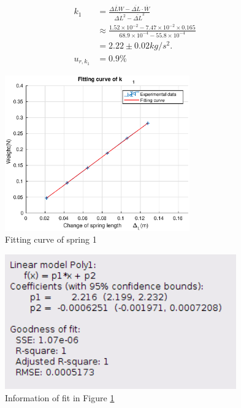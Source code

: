     \begin{figure}[h]    
        \begin{minipage}{0.5\linewidth}
            \[
            \begin{split}
                k_1&=\frac{\overline{\Delta LW}-\overline{\Delta L}\cdot\overline{W}}{\overline{\Delta L^2}-\overline{\Delta L}^2}\\[0.2cm]
                &\approx \frac{1.52\times10^{-2}-7.47\times10^{-2}\times0.165}{68.9\times10^{-4}-55.8\times10^{-4}}\\[0.2cm]
                &=2.22\pm 0.02kg/s^2.\\[0.4cm]
                u_{r,k_1}&=0.9\%
            \end{split}
            \]
        \end{minipage}
        \begin{minipage}{0.4\linewidth}
            \centering
            \includegraphics[height=6.7cm]{images/k1.eps}
            \caption{Fitting curve of spring 1}\label{k_1}
        \end{minipage}
    \end{figure}
    \newpage
    \begin{figure}[!h]
        \centering
        \includegraphics[height=5.8cm]{images/k1info.png}
        \caption{Information of fit in Figure \ref{k_1}}\label{k1info}
    \end{figure}
